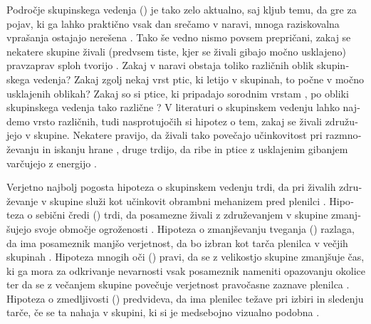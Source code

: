 \begin{slovenian}
Področje skupinskega vedenja () je tako zelo aktualno, saj kljub temu, da gre za pojav, ki ga lahko praktično vsak dan srečamo v naravi, mnoga raziskovalna vprašanja ostajajo nerešena \cite{krause2002living,lebarbajec2009organized,sumpter2006principles}. Tako še vedno nismo povsem prepričani, zakaj se nekatere skupine živali (predvsem tiste, kjer se živali gibajo močno usklajeno) pravzaprav sploh tvorijo \cite{lebarbajec2009organized}. Zakaj v naravi obstaja toliko različnih oblik skupinskega vedenja? Zakaj zgolj nekaj vrst ptic, ki letijo v skupinah, to počne v močno usklajenih oblikah? Zakaj so si ptice, ki pripadajo sorodnim vrstam \cite{jarvis2014wholegenome}, po obliki skupinskega vedenja tako različne \cite{lebarbajec2009organized}? V literaturi o skupinskem vedenju lahko najdemo vrsto različnih, tudi nasprotujočih si hipotez o tem, zakaj se živali združujejo v skupine. Nekatere pravijo, da živali tako povečajo učinkovitost pri razmnoževanju in iskanju hrane \cite{krebs1994behavioural}, druge trdijo, da ribe in ptice z usklajenim gibanjem varčujejo z energijo \cite{hemelrijk2014increased,marras2015fish,portugal2014upwash}.

Verjetno najbolj pogosta hipoteza o skupinskem vedenju trdi, da pri živalih združevanje v skupine služi kot učinkovit obrambni mehanizem pred plenilci \cite{cresswell2011predicting,hart2005predator,krause2002living,larsson2012why,lebarbajec2009organized,nishimura2002predator,pavlov2000patterns}. Hipoteza o sebični čredi () trdi, da posamezne živali z združevanjem v skupine zmanjšujejo svoje območje ogroženosti \cite{hamilton1971geometry,viscido2001response}. Hipoteza o zmanjševanju tveganja () razlaga, da ima posameznik manjšo verjetnost, da bo izbran kot tarča plenilca v večjih skupinah \cite{tosh2011conditions}. Hipoteza mnogih oči () pravi, da se z velikostjo skupine zmanjšuje čas, ki ga mora za odkrivanje nevarnosti vsak posameznik nameniti opazovanju okolice \cite{elgar1989predator,haley2014exploring,ruxton2008application,sadedin1998influence} ter da se z večanjem skupine povečuje verjetnost pravočasne zaznave plenilca \cite{galton1871gregariousness}. Hipoteza o zmedljivosti () predvideva, da ima plenilec težave pri izbiri in sledenju tarče, če se ta nahaja v skupini, ki si je medsebojno vizualno podobna \cite{demsar2015simulating,kunz2006prey,nishimura2002predator,olson2013predator,olson2016evolution,zheng2005behavior}.


\end{slovenian}
